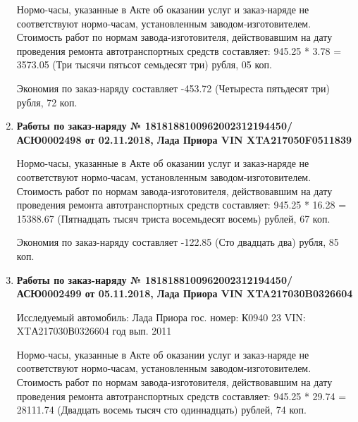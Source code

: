 \begin{enumerate}




Нормо-часы, указанные в Акте об оказании услуг и заказ-наряде не соответствуют нормо-часам,  установленным заводом-изготовителем.\\
Стоимость работ по нормам завода-изготовителя, действовавшим на дату проведения ремонта автотранспортных средств составляет: 945.25 * 3.78 = 3573.05 (Три тысячи пятьсот семьдесят три) рубля, 05 коп.

Экономия по заказ-наряду составляет -453.72 (Четыреста пятьдесят три) рубля, 72 коп.  
\vspace{3mm}







\item \par\textbf{{Работы по заказ-наряду № 1818188100962002312194450/\-АСЮ0002498 от 02.11.2018, Лада Приора  VIN  XTA217050F0511839}}


Нормо-часы, указанные в Акте об оказании услуг и заказ-наряде не соответствуют нормо-часам,  установленным заводом-изготовителем.\\
Стоимость работ по нормам завода-изготовителя, действовавшим на дату проведения ремонта автотранспортных средств составляет: 945.25 * 16.28 = 15388.67 (Пятнадцать тысяч триста восемьдесят восемь) рублей, 67 коп.

Экономия по заказ-наряду составляет -122.85 (Сто двадцать два) рубля, 85 коп.  
\vspace{3mm}





\item \par\textbf{{Работы по заказ-наряду  № 1818188100962002312194450/\-АСЮ0002499 от 05.11.2018, Лада Приора   VIN XTA217030B0326604}}

Исследуемый автомобиль: Лада Приора гос. номер: К0940 23 VIN: XTА217030В0326604 год вып. 2011



Нормо-часы, указанные в Акте об оказании услуг и заказ-наряде не соответствуют нормо-часам,  установленным заводом-изготовителем.\\
Стоимость работ по нормам завода-изготовителя, действовавшим на дату проведения ремонта автотранспортных средств составляет: 945.25 * 29.74 = 28111.74 (Двадцать восемь тысяч сто одиннадцать) рублей, 74 коп.


\end{enumerate}
